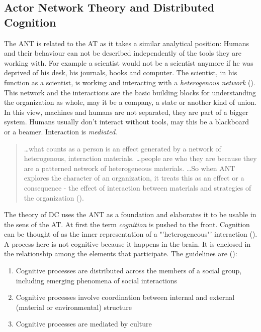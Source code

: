 \subsection{Actor Network Theory and Distributed Cognition}
The \ac{ANT} is related to the \acs{AT} as it takes a similar analytical position: Humans and their behaviour can not be described independently of the tools they are working with. For example a scientist would not be a scientist anymore if he was deprived of his desk, his journals, books and computer. The scientist, in his function as a scientist, is working and interacting with a \textit{heterogenous network} (\cite{law1992notes}). This network and the interactions are the basic building blocks for understanding the organization as whole, may it be a company, a state or another kind of union. In this view, machines and humans are not separated, they are part of a bigger system. Humans usually don't interact without tools, may this be a blackboard or a beamer. Interaction is  \textit{mediated}.
\begin{quotation}
  \dots what counts as a person is an effect generated by a network of heterogenous, interaction materials. \dots people are who they are because they are a patterned network of heterogeneous materials. \dots So when \acs{ANT} explores the character of an organization, it treats this as an effect or a consequence - the effect of interaction between materials and strategies of the organization (\cite{law1992notes}).
\end{quotation}

The theory of \ac{DC} uses the \acs{ANT} as a foundation and elaborates it to be usable in the sens of the \acs{AT}. At first the term \textit{cognition} is pushed to the front. Cognition can be thought of as the inner representation of a "'heterogeneous"' interaction (\cite{hutchins2000distributed}). A process here is not cognitive because it happens in the brain. It is enclosed in the relationship among the elements that participate. The guidelines are (\cite{hollan2000distributed}):
\begin{enumerate}
  \item Cognitive processes are distributed across the members of a social group, including emerging phenomena of social interactions
  \item Cognitive processes involve coordination between internal and external (material or environmental) structure
  \item Cognitive processes are mediated by culture
\end{enumerate}

